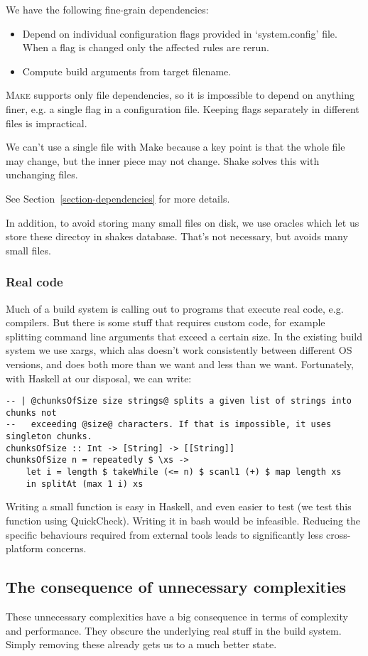 We have the following fine-grain dependencies:
\begin{itemize}
  \item Depend on individual configuration flags provided in `system.config'
  file. When a flag is changed only the affected rules are rerun.
  \item Compute build arguments from target filename.
\end{itemize}

\textsc{Make} supports only file dependencies, so it is impossible to depend
on anything finer, e.g. a single flag in a configuration file. Keeping flags
separately in different files is impractical.

We can't use a single file with Make because a key point is that the whole file may change,
but the inner piece may not change. Shake solves this with unchanging files.

See Section~\ref{section-dependencies} for more details.

In addition, to avoid storing many small files on disk, we use oracles which let us store these directoy in shakes database. That's not necessary, but avoids many small files.

\subsubsection{Real code}

Much of a build system is calling out to programs that execute real code, e.g. compilers. But there is some stuff that requires custom code, for example splitting command line arguments that exceed a certain size. In the existing build system we use xargs, which alas doesn't work consistently between different OS versions, and does both more than we want and less than we want. Fortunately, with Haskell at our disposal, we can write:

\begin{verbatim}
-- | @chunksOfSize size strings@ splits a given list of strings into chunks not
--   exceeding @size@ characters. If that is impossible, it uses singleton chunks.
chunksOfSize :: Int -> [String] -> [[String]]
chunksOfSize n = repeatedly $ \xs ->
    let i = length $ takeWhile (<= n) $ scanl1 (+) $ map length xs
    in splitAt (max 1 i) xs
\end{verbatim}

Writing a small function is easy in Haskell, and even easier to test (we test this function using QuickCheck). Writing it in bash would be infeasible. Reducing the specific behaviours required from external tools leads to significantly less cross-platform concerns.

\subsection{The consequence of unnecessary complexities}

These unnecessary complexities have a big consequence in terms of complexity and performance. They obscure the underlying real stuff in the build system. Simply removing these already gets us to a much better state.
